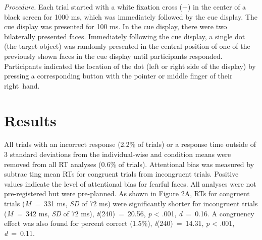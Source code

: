 \documentclass[issue,twocolumn,empirical, authordate,10pt]{jote-new-article}
\begin{document}
\emph{Procedure. }Each trial started with a white fixation cross (+) in the center of a black screen for 1000 ms, which was immediately followed by the cue display. The cue display was presented for 100 ms. In the cue display, there were two bilaterally presented faces. Immediately following the cue display, a single dot (the target object) was randomly presented in the central position of one of the previously shown faces in the cue display until participants responded. Participants indicated the location of the dot (left or right side of the display) by pressing a corresponding button with the pointer or middle finger of their right~hand.

\section{Results}

All trials with an incorrect response (2.2\% of trials) or a response time outside of 3 standard deviations from the individual-wise and condition means were removed from all RT analyses (0.6\% of trials). Attentional bias was measured by subtrac    ting mean RTs for congruent trials from incongruent trials. Positive values indicate the level of attentional bias for fearful faces. All analyses were not pre-registered but were pre-planned. As shown in Figure 2A, RTs for congruent trials (\emph{M~=~}331 ms, \emph{SD} of 72 ms) were significantly shorter for incongruent trials (\emph{M~=~}342 ms, \emph{SD} of 72 ms), \emph{t}(240)~=~20.56, \emph{p} < .001, \emph{d}~=~0.16. A congruency effect was also found for percent correct (1.5\%), \emph{t}(240)~=~14.31, \emph{p} < .001, \emph{d}~=~0.11.
\end{document}
